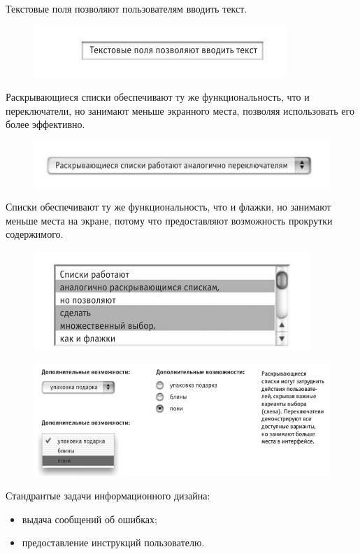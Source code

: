 \documentclass{beamer}
\begin{document}
\begin{frame}[t]
Текстовые поля позволяют пользователям вводить текст.
\begin{figure}[h]
\centering
\includegraphics[scale=0.5]{images/lec04-pic07.png}
\end{figure}

Раскрывающиеся списки обеспечивают ту же функциональность, что и переключатели, но занимают меньше экранного места, позволяя использовать его более эффективно.
\begin{figure}[h]
\centering
\includegraphics[scale=0.5]{images/lec04-pic08.png}
\end{figure}

Списки обеспечивают ту же функциональность, что и флажки, но занимают меньше места на экране, потому что предоставляют возможность прокрутки содержимого. 
\begin{figure}[h]
\centering
\includegraphics[scale=0.5]{images/lec04-pic09.png}
\end{figure}
\end{frame}

\begin{frame}[t]
\begin{figure}[h]
\centering
\includegraphics[scale=0.5]{images/lec04-pic11.png}
\end{figure}
Стандрантые задачи информационного дизайна:
\begin{itemize}
\item выдача сообщений об ошибках;
\item предоставление инструкций пользователю.
\end{itemize}
\end{frame}
\end{document}
